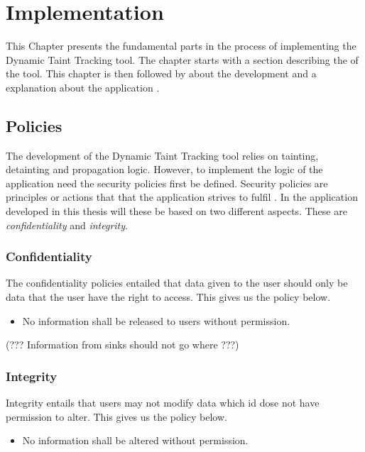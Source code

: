 \chapter{Implementation}
This Chapter presents the fundamental parts in the process of implementing the Dynamic Taint Tracking tool. The chapter starts with a section describing the \textit{} of the tool. This chapter is then followed by \textit{} about the development and a explanation about the application \textit{}.


\section{Policies}
\label{Policies}
The development of the Dynamic Taint Tracking tool relies on tainting, detainting and propagation logic. However, to implement the logic of the application need the security policies first be defined. Security policies are principles or actions that that the application strives to fulfil \parencite{BayukJenniferL2012Cspg}. In the application developed in this thesis will these be based on two different aspects. These are \textit{confidentiality} and \textit{integrity}.


\subsection{Confidentiality}
The confidentiality policies entailed that data given to the user should only be data that the user have the right to access. This gives us the policy below.

\hfill
\begin{itemize}
	\item No information shall be released to users without permission.
\end{itemize}
\hfill

(??? Information from sinks should not go where ???)


\subsection{Integrity}
Integrity entails that users may not modify data which id dose not have permission to alter. This gives us the policy below.

\hfill
\begin{itemize}
	\item No information shall be altered without permission.
\end{itemize}
\hfill

